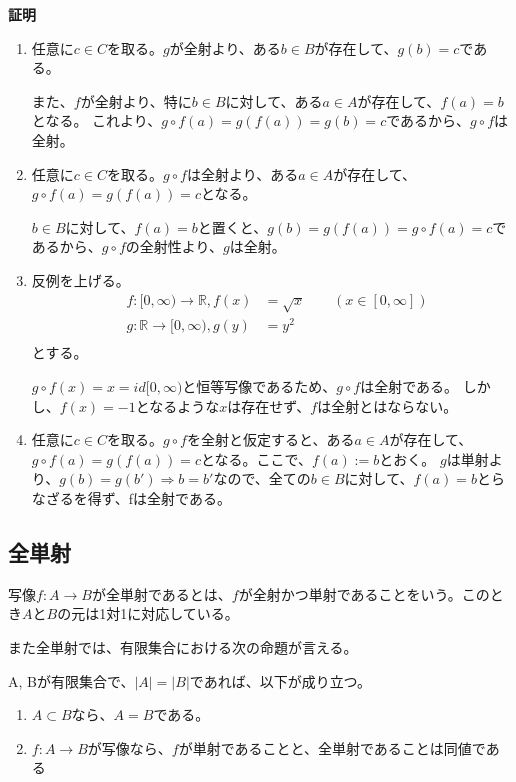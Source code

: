 \documentclass[dvipdfmx,autodetect-engine]{jsarticle}
\begin{document}
{ \bf 証明}

\begin{enumerate}
\renewcommand{\labelenumi}{(\arabic{enumi})}
	\item 任意に$c \in C$を取る。$g$が全射より、ある$b \in B$が存在して、$g(b) = c$である。
	
	また、$f$が全射より、特に$b \in B$に対して、ある$a \in A$が存在して、$f(a) = b$となる。
	これより、$g \circ f(a) = g(f(a)) = g(b) = c$であるから、$g \circ f$は全射。
	
	\item 任意に$c \in C$を取る。$g \circ f$は全射より、ある$a \in A$が存在して、$g \circ f(a) = g(f(a)) = c$となる。
	
	$b \in B$に対して、$f(a) = b$と置くと、$g(b) = g(f(a)) = g \circ f(a) = c$であるから、$g \circ f$の全射性より、$g$は全射。
	
    \item 反例を上げる。
    \begin{eqnarray*}
    &f:[0,∞) \to \mathbb{R}, f(x) &= \sqrt{x} \quad \quad (x \in [0,∞]) \\
    &g:\mathbb{R} \to [0, ∞), g(y) &= y^2 \\
    \end{eqnarray*}
    とする。
    
    $g \circ f(x) = x = id[0,∞)$と恒等写像であるため、$g \circ f$は全射である。
    しかし、$f(x) = −1$となるような$x$は存在せず、$f$は全射とはならない。
	
	\item 任意に$c \in C$を取る。$g \circ f$を全射と仮定すると、ある$a \in A$が存在して、$g \circ f(a) = g(f(a)) = c$となる。ここで、$f(a) := b$とおく。
	$g$は単射より、$g(b) = g(b') \Rightarrow b = b'$なので、全ての$b \in B$に対して、$f(a) = b$とらなざるを得ず、fは全射である。
\end{enumerate}


\subsection{全単射}

写像$f: A \to B$が全単射であるとは、$f$が全射かつ単射であることをいう。このとき$A$と$B$の元は1対1に対応している。

また全単射では、有限集合における次の命題が言える。

\prop

A, Bが有限集合で、$|A| = |B|$であれば、以下が成り立つ。
\begin{enumerate}
\renewcommand{\labelenumi}{(\arabic{enumi})}
\item $A \subset B$なら、$A = B$である。
\item $f: A \to B$が写像なら、$f$が単射であることと、全単射であることは同値である
\end{enumerate}
\end{document}

